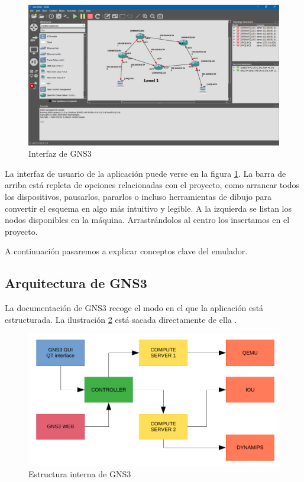 \begin{figure}[h]
  \centering
  \includegraphics[scale=0.15]{imagenes/interfazgns}
  \caption{Interfaz de GNS3}
  \label{fig:interfazgns}
\end{figure}

La interfaz de usuario de la aplicación puede verse en la figura \ref{fig:interfazgns}. La barra de arriba está repleta de opciones relacionadas con el proyecto, como arrancar todos los dispositivos, pausarlos, pararlos o incluso herramientas de dibujo para convertir el esquema en algo más intuitivo y legible. A la izquierda se listan los nodos disponibles en la máquina. Arrastrándolos al centro los insertamos en el proyecto.

A continuación pasaremos a explicar conceptos clave del emulador.

\subsection{Arquitectura de GNS3}
La documentación de GNS3 recoge el modo en el que la aplicación está estructurada. La ilustración \ref{fig:estructuragns3} está sacada directamente de ella \cite{structuregns3}.

\begin{figure}[h]
  \centering
  \includegraphics[scale=0.6]{imagenes/estructuragns3}
  \caption{Estructura interna de GNS3}
  \label{fig:estructuragns3}
\end{figure}

